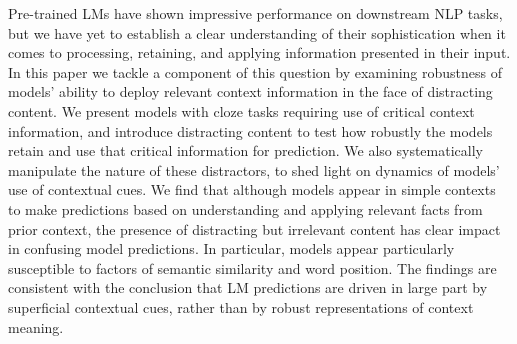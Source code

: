 Pre-trained LMs have shown impressive performance on downstream NLP tasks, but we have yet to establish a clear understanding of their sophistication when it comes to processing, retaining, and applying information presented in their input. In this paper we tackle a component of this question by examining robustness of models' ability to deploy relevant context information in the face of distracting content. We present models with cloze tasks requiring use of critical context information, and introduce distracting content to test how robustly the models retain and use that critical information for prediction. We also systematically manipulate the nature of these distractors, to shed light on dynamics of models' use of contextual cues. We find that although models appear in simple contexts to make predictions based on understanding and applying relevant facts from prior context, the presence of distracting but irrelevant content has clear impact in confusing model predictions. In particular, models appear particularly susceptible to factors of semantic similarity and word position. The findings are consistent with the conclusion that LM predictions are driven in large part by superficial contextual cues, rather than by robust representations of context meaning.
